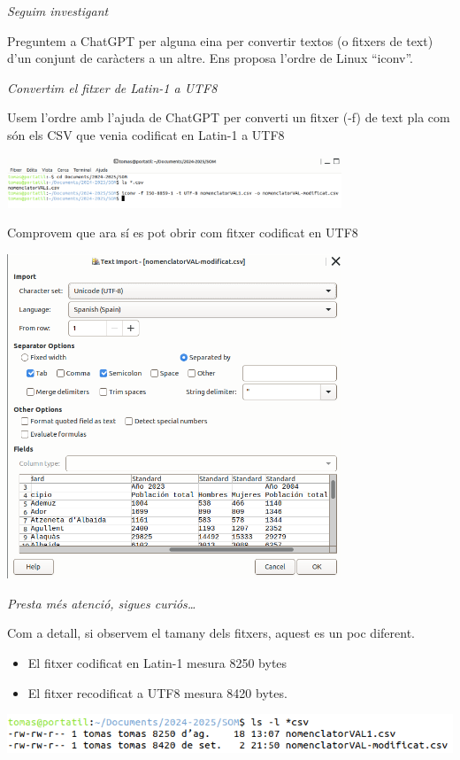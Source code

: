 \documentclass[
  12 pt,
  a4paper,
]{article}
\providecommand{\tightlist}{%
  \setlength{\itemsep}{0pt}\setlength{\parskip}{0pt}}
\begin{document}
\emph{Seguim investigant}

Preguntem a ChatGPT per alguna eina per convertir textos (o fitxers de
text) d'un conjunt de caràcters a un altre. Ens proposa l'ordre de Linux
``iconv''.

\emph{Convertim el fitxer de Latin-1 a UTF8}

Usem l'ordre amb l'ajuda de ChatGPT per converti un fitxer (-f) de text
pla com són els CSV que venia codificat en Latin-1 a UTF8

\includegraphics[width=0.75\textwidth,height=\textheight]{png/iconv.png}

Comprovem que ara sí es pot obrir com fitxer codificat en UTF8

\includegraphics[width=0.75\textwidth,height=\textheight]{png/csv3.png}

\emph{Presta més atenció, sigues curiós\ldots{}}

Com a detall, si observem el tamany dels fitxers, aquest es un poc
diferent.

\begin{itemize}
\tightlist
\item
  El fitxer codificat en Latin-1 mesura 8250 bytes
\item
  El fitxer recodificat a UTF8 mesura 8420 bytes.
\end{itemize}

\includegraphics{png/ls.png}
\end{document}
